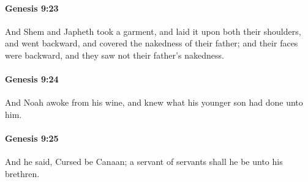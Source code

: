 		\paragraph{Genesis 9:23} %
			\label{GENESIS-9-23}

			And Shem and Japheth took a garment, and laid it upon both their shoulders, and went backward, and covered the nakedness of their father; and their faces were backward, and they saw not their father's nakedness.


		\paragraph{Genesis 9:24} %
			\label{GENESIS-9-24}

			And Noah awoke from his wine, and knew what his younger son had done unto him.


		\paragraph{Genesis 9:25} %
			\label{GENESIS-9-25}

			And he said, Cursed be Canaan; a servant of servants shall he be unto his brethren.



